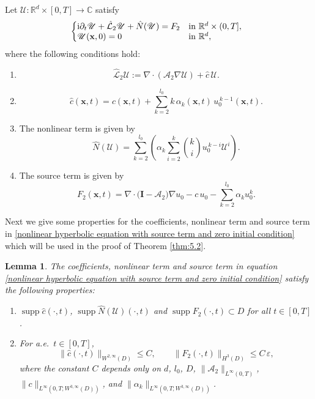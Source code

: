 \documentclass[11pt,reqno,oneside]{amsart}
\numberwithin{equation}{section}
\newtheorem{lemma}[theorem]{Lemma}
\theoremstyle{definition}
\theoremstyle{remark}
\numberwithin{equation}{section}
\begin{document}
	Let $\mathscr{U}:\mathbb{R}^d\times [0,T]\rightarrow \mathbb{C}$ satisfy
	\begin{equation}\label{nonlinear hyperbolic equation with source term and zero initial condition}
		\left\{
		\begin{array}{@{}l@{\quad}l}
			\mathrm{i}\partial_t \mathscr{U}+\hat{\mathcal{L}}_2 \mathscr{U} + \hat{N}(\mathscr{U}) = F_2 & \text{in } \mathbb{R}^d \times (0,T], \\
			\mathscr{U}(\mathbf{x},0) = 0 & \text{in } \mathbb{R}^{d},
		\end{array}
		\right.
	\end{equation}
	where the following conditions hold:
\begin{enumerate}
	\item
	\[
	\hat{\mathcal{L}}_2\mathscr{U} := \nabla\cdot(\mathscr{A}_2\nabla \mathscr{U}) + \hat{c}\,\mathscr{U}.
	\]
	
	\item
	\[
	\hat{c}(\mathbf{x},t) = c(\mathbf{x},t) + \sum_{k=2}^{l_0} k\,\alpha_k(\mathbf{x},t)\,u_{0}^{\,k-1}(\mathbf{x},t).
	\]
	
	\item The nonlinear term is given by
	\begin{equation}\label{eq:hatN}
		\hat{N}(\mathscr{U})
		= \sum_{k=2}^{l_0} \left(\alpha_k \sum_{i=2}^k \binom{k}{i} u_{0}^{\,k-i} \mathscr{U}^i \right).
	\end{equation}
	
	\item The source term is given by
	\begin{equation}\label{eq:F2}
		F_2(\mathbf{x},t)
		= \nabla\cdot\big(\mathbf{I}-\mathscr{A}_2\big)\nabla u_0
		- c\,u_0 - \sum_{k=2}^{l_0}\alpha_k u_0^k.
	\end{equation}
\end{enumerate}

	Next we give some properties for the coefficients, nonlinear term and source term in \eqref{nonlinear hyperbolic equation with source term and zero initial condition} which will be used in the proof of Theorem \ref{thm:5.2}.
	\begin{lemma}\label{Lemma 5.1}
		The coefficients, nonlinear term and source term in equation \eqref{nonlinear hyperbolic equation with source term and zero initial condition} satisfy the following properties:
		\begin{enumerate}
			\item $\operatorname{supp}\hat{c}(\cdot,t)$, $\operatorname{supp}\hat{N}(\mathscr{U})(\cdot,t)$
			and $\operatorname{supp}F_2(\cdot,t)\subset D$ for all $t\in[0,T]$.
			
			\item For a.e.\ $t\in[0,T]$,
			\[
			\|\hat{c}(\cdot,t)\|_{W^{2,\infty}(D)}\le C,\qquad
			\|F_2(\cdot,t)\|_{H^{3}(D)} \le C\,\varepsilon,
			\]
			where the constant $C$ depends only on $d$, $l_0$, $D$, $\|\mathscr{A}_2\|_{L^\infty(0,T)}$,
			$\|c\|_{L^\infty(0,T;W^{3,\infty}(D))}$, and $\|\alpha_k\|_{L^\infty(0,T;W^{3,\infty}(D))}$.
		\end{enumerate}
	\end{lemma}
	
\end{document}
